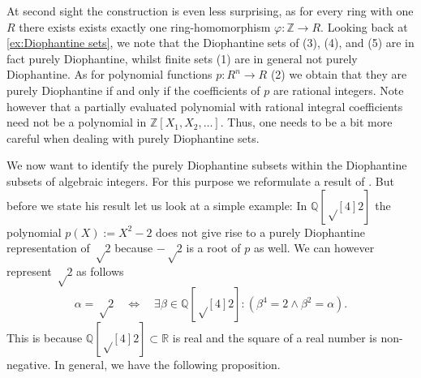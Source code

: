 At second sight the construction is even less surprising, as for every ring with
one \(R\) there exists exists exactly one ring-homomorphism \(φ: ℤ → R\).
Looking back at \cref{ex:Diophantine sets}, we note that the Diophantine sets of
(3), (4), and (5) are in fact purely Diophantine, whilst finite sets (1) are in
general not purely Diophantine. As for polynomial functions \(p: R^n → R\) (2)
we obtain that they are purely Diophantine if and only if the coefficients of
\(p\) are rational integers. Note however that a partially evaluated polynomial
with rational integral coefficients need not be a polynomial in \(ℤ[X_1, X_2,
…]\). Thus, one needs to be a bit more careful when dealing with purely
Diophantine sets.

We now want to identify the purely Diophantine subsets within the Diophantine
subsets of algebraic integers. For this purpose we reformulate a result of
\textcite{Robinson1951}. But before we state his result let us look at a simple
example: In \(ℚ{[√[4]{2}]}\) the polynomial \(p(X) := X^2 - 2\) does
not give rise to a purely Diophantine representation of \(√2\) because \(-√2\)
is a root of \(p\) as well. We can however represent \(√2\) as follows
\[
  α = √2 \quad ⇔ \quad
  ∃ β ∈ ℚ{[√[4]{2}]} : (β^4 = 2 ∧ β^2 = α).
\]
This is because \(ℚ{[√[4]{2}]} ⊂ ℝ\) is real and the square of a real number is
non-negative. In general, we have the following proposition.

